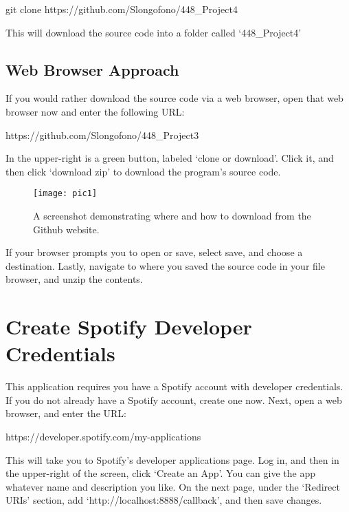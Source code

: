 \documentclass{roffin}
\begin{document}
\hspace{1cm} git clone https://github.com/Slongofono/448\_Project4

\hfill
\newline
This will download the source code into a folder called `448\_Project4' 

\subsection{Web Browser Approach}
If you would rather download the source code via a web browser, open that web browser now and enter the following URL: 
\newline

\hspace{1cm} https://github.com/Slongofono/448\_Project3

\hfill
\newline
In the upper-right is a green button, labeled `clone or download'. Click it, and then click `download zip' to download the program’s source code.

\begin{figure}[!h]
    \centering
    \texttt{[image: pic1]}
    \caption{A screenshot demonstrating where and how to download from the Github website.}
    \label{fig:fig1}
\end{figure}

If your browser prompts you to open or save, select save, and choose a destination. Lastly, navigate to where you saved the source code in your file browser, and unzip the contents.

\section{Create Spotify Developer Credentials}

This application requires you have a Spotify account with developer credentials. If you do not already have a Spotify account, create one now. Next, open a web browser, and enter the URL:  
\newline

\hspace{1cm} https://developer.spotify.com/my-applications

\hfill
\newline
This will take you to Spotify's developer applications page. Log in, and then in the upper-right of the screen, click `Create an App'. You can give the app whatever name and description you like. On the next page, under the `Redirect URIs' section, add `http://localhost:8888/callback', and then save changes.
\end{document}
